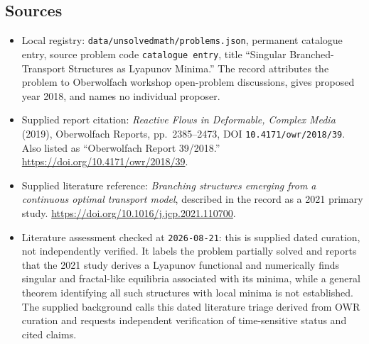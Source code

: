 \documentclass[11pt]{article}
\begin{document}
\subsection{Sources}
\begin{itemize}
\item Local registry: \texttt{data/unsolvedmath/problems.json}, permanent catalogue entry, source problem code \texttt{catalogue entry}, title ``Singular Branched-Transport Structures as Lyapunov Minima.'' The record attributes the problem to Oberwolfach workshop open-problem discussions, gives proposed year 2018, and names no individual proposer.
\item Supplied report citation: \emph{Reactive Flows in Deformable, Complex Media} (2019), Oberwolfach Reports, pp.\ 2385--2473, DOI \texttt{10.4171/owr/2018/39}. Also listed as ``Oberwolfach Report 39/2018.'' \url{https://doi.org/10.4171/owr/2018/39}.
\item Supplied literature reference: \emph{Branching structures emerging from a continuous optimal transport model}, described in the record as a 2021 primary study. \url{https://doi.org/10.1016/j.jcp.2021.110700}.
\item Literature assessment checked at \texttt{2026-08-21}: this is supplied dated curation, not independently verified. It labels the problem partially solved and reports that the 2021 study derives a Lyapunov functional and numerically finds singular and fractal-like equilibria associated with its minima, while a general theorem identifying all such structures with local minima is not established. The supplied background calls this dated literature triage derived from OWR curation and requests independent verification of time-sensitive status and cited claims.
\end{itemize}
\end{document}
